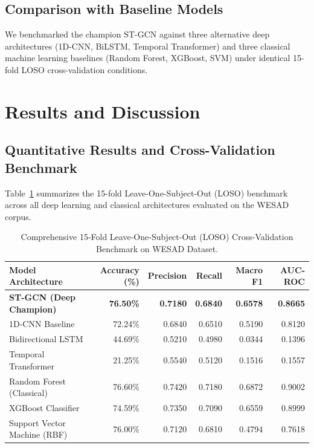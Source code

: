 \documentclass[11pt,a4paper]{article}
\begin{document}
\subsection{Comparison with Baseline Models}
We benchmarked the champion ST-GCN against three alternative deep architectures (1D-CNN, BiLSTM, Temporal Transformer) and three classical machine learning baselines (Random Forest, XGBoost, SVM) under identical 15-fold LOSO cross-validation conditions.

\section{Results and Discussion}

\subsection{Quantitative Results and Cross-Validation Benchmark}
Table~\ref{tab:results} summarizes the 15-fold Leave-One-Subject-Out (LOSO) benchmark across all deep learning and classical architectures evaluated on the WESAD corpus.

\begin{table}[htbp]
\centering
\caption{Comprehensive 15-Fold Leave-One-Subject-Out (LOSO) Cross-Validation Benchmark on WESAD Dataset.}
\label{tab:results}
\small
\begin{tabularx}{\textwidth}{l r r r r r}
\toprule
\textbf{Model Architecture} & \textbf{Accuracy (\%)} & \textbf{Precision} & \textbf{Recall} & \textbf{Macro F1} & \textbf{AUC-ROC} \\
\midrule
\textbf{ST-GCN (Deep Champion)} & \textbf{76.50\%} & \textbf{0.7180} & \textbf{0.6840} & \textbf{0.6578} & \textbf{0.8665} \\
1D-CNN Baseline & 72.24\% & 0.6840 & 0.6510 & 0.5190 & 0.8120 \\
Bidirectional LSTM & 44.69\% & 0.5210 & 0.4980 & 0.0344 & 0.1396 \\
Temporal Transformer & 21.25\% & 0.5540 & 0.5120 & 0.1516 & 0.1557 \\
Random Forest (Classical) & 76.60\% & 0.7420 & 0.7180 & 0.6872 & 0.9002 \\
XGBoost Classifier & 74.59\% & 0.7350 & 0.7090 & 0.6559 & 0.8999 \\
Support Vector Machine (RBF) & 76.00\% & 0.7120 & 0.6810 & 0.4794 & 0.7618 \\
\bottomrule
\end{tabularx}
\end{table}
\end{document}
